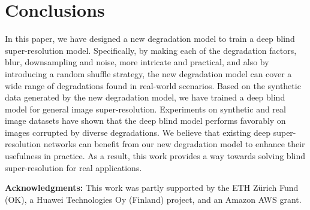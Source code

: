 \documentclass[10pt,twocolumn,letterpaper]{article}
\begin{document}
\section{Conclusions}
\label{sec:conclusion}
In this paper, we have designed a new degradation model to train a deep blind super-resolution model. Specifically, by making each of the degradation factors, \ie blur, downsampling and noise, more intricate and practical, and also by introducing a random shuffle strategy, the new degradation model can cover a wide range of degradations found in real-world scenarios. Based on the synthetic data generated by the new degradation model, we have trained a deep blind model for general image super-resolution. Experiments on synthetic and real image datasets have shown that the deep blind model performs favorably on images corrupted by diverse degradations.
We believe that existing deep super-resolution networks can benefit from our new degradation model to enhance their usefulness in practice. As a result, this work provides a way towards solving blind super-resolution for real applications.

\noindent\textbf{Acknowledgments:}
This work was partly supported by the ETH Z\"urich Fund (OK), a Huawei Technologies Oy (Finland) project, and an Amazon AWS grant.



{\small


}
\end{document}
